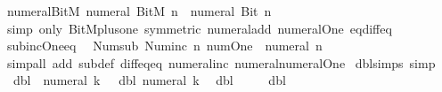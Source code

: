\begin{isabellebody}
\isamarkupfalse%
\ numeral{\isacharunderscore}{\kern0pt}BitM{\isacharcolon}{\kern0pt}\ {\isachardoublequoteopen}numeral\ {\isacharparenleft}{\kern0pt}BitM\ n{\isacharparenright}{\kern0pt}\ {\isacharequal}{\kern0pt}\ numeral\ {\isacharparenleft}{\kern0pt}Bit{}\ n{\isacharparenright}{\kern0pt}\ {\isacharminus}{\kern0pt}\ {}{\isachardoublequoteclose}\isanewline
%
\isadelimproof
\ \ %
\endisadelimproof
%
\isatagproof
{}\isamarkupfalse%
\ {\isacharparenleft}{\kern0pt}simp\ only{\isacharcolon}{\kern0pt}\ BitM{\isacharunderscore}{\kern0pt}plus{\isacharunderscore}{\kern0pt}one\ {\isacharbrackleft}{\kern0pt}symmetric{\isacharbrackright}{\kern0pt}\ numeral{\isacharunderscore}{\kern0pt}add\ numeral{\isacharunderscore}{\kern0pt}One\ eq{\isacharunderscore}{\kern0pt}diff{\isacharunderscore}{\kern0pt}eq{\isacharparenright}{\kern0pt}%
\endisatagproof
{\isafoldproof}%
%
\isadelimproof
\isanewline
%
\endisadelimproof
\isanewline
{}\isamarkupfalse%
\ sub{\isacharunderscore}{\kern0pt}inc{\isacharunderscore}{\kern0pt}One{\isacharunderscore}{\kern0pt}eq{\isacharcolon}{\kern0pt}\isanewline
\ \ {\isacartoucheopen}Num{\isachardot}{\kern0pt}sub\ {\isacharparenleft}{\kern0pt}Num{\isachardot}{\kern0pt}inc\ n{\isacharparenright}{\kern0pt}\ num{\isachardot}{\kern0pt}One\ {\isacharequal}{\kern0pt}\ numeral\ n{\isacartoucheclose}\isanewline
%
\isadelimproof
\ \ %
\endisadelimproof
%
\isatagproof
{}\isamarkupfalse%
\ {\isacharparenleft}{\kern0pt}simp{\isacharunderscore}{\kern0pt}all\ add{\isacharcolon}{\kern0pt}\ sub{\isacharunderscore}{\kern0pt}def\ diff{\isacharunderscore}{\kern0pt}eq{\isacharunderscore}{\kern0pt}eq\ numeral{\isacharunderscore}{\kern0pt}inc\ numeral{\isachardot}{\kern0pt}numeral{\isacharunderscore}{\kern0pt}One{\isacharparenright}{\kern0pt}%
\endisatagproof
{\isafoldproof}%
%
\isadelimproof
\isanewline
%
\endisadelimproof
\isanewline
{}\isamarkupfalse%
\ dbl{\isacharunderscore}{\kern0pt}simps\ {\isacharbrackleft}{\kern0pt}simp{\isacharbrackright}{\kern0pt}{\isacharcolon}{\kern0pt}\isanewline
\ \ {\isachardoublequoteopen}dbl\ {\isacharparenleft}{\kern0pt}{\isacharminus}{\kern0pt}\ numeral\ k{\isacharparenright}{\kern0pt}\ {\isacharequal}{\kern0pt}\ {\isacharminus}{\kern0pt}\ dbl\ {\isacharparenleft}{\kern0pt}numeral\ k{\isacharparenright}{\kern0pt}{\isachardoublequoteclose}\isanewline
\ \ {\isachardoublequoteopen}dbl\ {}\ {\isacharequal}{\kern0pt}\ {}{\isachardoublequoteclose}\isanewline
\ \ {\isachardoublequoteopen}dbl\ {}\ {\isacharequal}{\kern0pt}\ {}{\isachardoublequoteclose}\isanewline

\end{isabellebody}
